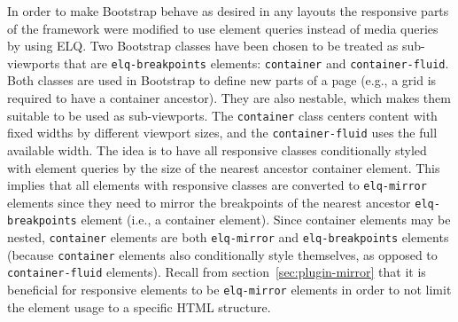 \documentclass{acm_proc_article-sp}
\newcommand{\code}[1]{\texttt{#1}}
\newcommand{\gls}[1]{#1}
\begin{document}
    In order to make \gls{Bootstrap} behave as desired in any layouts the \gls{responsive} parts of the framework were modified to use element queries instead of \gls{media queries} by using \gls{ELQ}.
    Two \gls{Bootstrap} classes have been chosen to be treated as sub-viewports that are \code{elq-breakpoints} elements: \code{container} and \code{container-fluid}.
    Both classes are used in \gls{Bootstrap} to define new parts of a page (e.g., a grid is required to have a container ancestor).
    They are also nestable, which makes them suitable to be used as sub-viewports.
    The \code{container} class centers content with fixed widths by different \gls{viewport} sizes, and the \code{container-fluid} uses the full available width.
    The idea is to have all \gls{responsive} classes conditionally styled with element queries by the size of the nearest ancestor container \gls{element}.
    This implies that all elements with \gls{responsive} classes are converted to \code{elq-mirror} elements since they need to mirror the breakpoints of the nearest ancestor \code{elq-breakpoints} element (i.e., a container \gls{element}).
    Since container elements may be nested, \code{container} elements are both \code{elq-mirror} and \code{elq-breakpoints} elements (because \code{container} elements also conditionally style themselves, as opposed to \code{container-fluid} elements).
    Recall from section~\ref{sec:plugin-mirror} that it is beneficial for \gls{responsive} elements to be \code{elq-mirror} elements in order to not limit the element usage to a specific \gls{HTML} structure.
\end{document}
